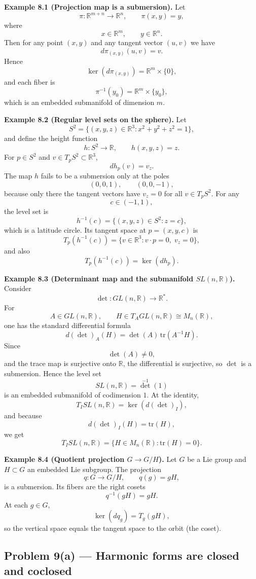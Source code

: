 \documentclass[12pt,a4paper]{article}
\theoremstyle{plain}
\theoremstyle{definition}      %
\begin{document}
\textbf{Example 8.1 (Projection map is a submersion).}
Let
\[
\pi:\mathbb{R}^{m+n}\to\mathbb{R}^{n},
\qquad
\pi(x,y)=y,
\]
where
\[
x\in\mathbb{R}^{m},
\qquad
y\in\mathbb{R}^{n}.
\]
Then for any point $(x,y)$ and any tangent vector $(u,v)$ we have
\[
d\pi_{(x,y)}(u,v)=v.
\]
Hence
\[
\ker(d\pi_{(x,y)})=\mathbb{R}^{m}\times\{0\},
\]
and each fiber is
\[
\pi^{-1}(y_0)=\mathbb{R}^{m}\times\{y_0\},
\]
which is an embedded submanifold of dimension $m$.

\medskip
\textbf{Example 8.2 (Regular level sets on the sphere).}
Let
\[
S^{2}=\{(x,y,z)\in\mathbb{R}^{3}:x^{2}+y^{2}+z^{2}=1\},
\]
and define the height function
\[
h:S^{2}\to\mathbb{R},
\qquad
h(x,y,z)=z.
\]
For $p\in S^{2}$ and $v\in T_{p}S^{2}\subset\mathbb{R}^{3}$,
\[
dh_{p}(v)=v_{z}.
\]
The map $h$ fails to be a submersion only at the poles
\[
(0,0,1),
\qquad
(0,0,-1),
\]
because only there the tangent vectors have $v_{z}=0$ for all $v\in T_{p}S^{2}$.
For any
\[
c\in(-1,1),
\]
the level set is
\[
h^{-1}(c)=\{(x,y,z)\in S^{2}:z=c\},
\]
which is a latitude circle. Its tangent space at $p=(x,y,c)$ is
\[
T_{p}(h^{-1}(c))=\{v\in\mathbb{R}^{3}:v\cdot p=0,\; v_{z}=0\},
\]
and also
\[
T_{p}(h^{-1}(c))=\ker(dh_{p}).
\]

\medskip
\textbf{Example 8.3 (Determinant map and the submanifold $SL(n,\mathbb{R})$).}
Consider
\[
\det:GL(n,\mathbb{R})\to\mathbb{R}^{\ast}.
\]
For
\[
A\in GL(n,\mathbb{R}),
\qquad
H\in T_{A}GL(n,\mathbb{R})\cong M_{n}(\mathbb{R}),
\]
one has the standard differential formula
\[
d(\det)_{A}(H)=\det(A)\,\mathrm{tr}(A^{-1}H).
\]
Since
\[
\det(A)\neq 0,
\]
and the trace map is surjective onto $\mathbb{R}$, the differential is surjective, so $\det$ is a submersion.
Hence the level set
\[
SL(n,\mathbb{R})=\det^{-1}(1)
\]
is an embedded submanifold of codimension $1$.
At the identity,
\[
T_{I}SL(n,\mathbb{R})=\ker(d(\det)_{I}),
\]
and because
\[
d(\det)_{I}(H)=\mathrm{tr}(H),
\]
we get
\[
T_{I}SL(n,\mathbb{R})=\{H\in M_{n}(\mathbb{R}):\mathrm{tr}(H)=0\}.
\]

\medskip
\textbf{Example 8.4 (Quotient projection $G\to G/H$).}
Let $G$ be a Lie group and $H\subset G$ an embedded Lie subgroup.
The projection
\[
q:G\to G/H,
\qquad
q(g)=gH,
\]
is a submersion.
Its fibers are the right cosets
\[
q^{-1}(gH)=gH.
\]
At each $g\in G$,
\[
\ker(dq_{g})=T_{g}(gH),
\]
so the vertical space equals the tangent space to the orbit (the coset).


\subsection*{Problem 9(a) — Harmonic forms are closed and coclosed}
\end{document}
